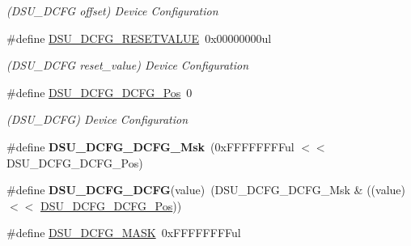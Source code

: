 \begin{DoxyCompactItemize}
\begin{DoxyCompactList}\small\item\em (D\+S\+U\+\_\+\+D\+C\+F\+G offset) Device Configuration \end{DoxyCompactList}\item 
\hypertarget{group___s_a_m_l21___d_s_u_ga0aa811e0e4f8e89e24c99f75474fe970}{}\#define \hyperlink{group___s_a_m_l21___d_s_u_ga0aa811e0e4f8e89e24c99f75474fe970}{D\+S\+U\+\_\+\+D\+C\+F\+G\+\_\+\+R\+E\+S\+E\+T\+V\+A\+L\+U\+E}~0x00000000ul\label{group___s_a_m_l21___d_s_u_ga0aa811e0e4f8e89e24c99f75474fe970}

\begin{DoxyCompactList}\small\item\em (D\+S\+U\+\_\+\+D\+C\+F\+G reset\+\_\+value) Device Configuration \end{DoxyCompactList}\item 
\hypertarget{group___s_a_m_l21___d_s_u_ga348297fbddb02f9feae2e71d890f447a}{}\#define \hyperlink{group___s_a_m_l21___d_s_u_ga348297fbddb02f9feae2e71d890f447a}{D\+S\+U\+\_\+\+D\+C\+F\+G\+\_\+\+D\+C\+F\+G\+\_\+\+Pos}~0\label{group___s_a_m_l21___d_s_u_ga348297fbddb02f9feae2e71d890f447a}

\begin{DoxyCompactList}\small\item\em (D\+S\+U\+\_\+\+D\+C\+F\+G) Device Configuration \end{DoxyCompactList}\item 
\hypertarget{group___s_a_m_l21___d_s_u_ga3e4e3f317b6651412351a130375cfab5}{}\#define {\bfseries D\+S\+U\+\_\+\+D\+C\+F\+G\+\_\+\+D\+C\+F\+G\+\_\+\+Msk}~(0x\+F\+F\+F\+F\+F\+F\+F\+Ful $<$$<$ D\+S\+U\+\_\+\+D\+C\+F\+G\+\_\+\+D\+C\+F\+G\+\_\+\+Pos)\label{group___s_a_m_l21___d_s_u_ga3e4e3f317b6651412351a130375cfab5}

\item 
\hypertarget{group___s_a_m_l21___d_s_u_gaddf763024200abb98a7b07f6a46b841f}{}\#define {\bfseries D\+S\+U\+\_\+\+D\+C\+F\+G\+\_\+\+D\+C\+F\+G}(value)~(D\+S\+U\+\_\+\+D\+C\+F\+G\+\_\+\+D\+C\+F\+G\+\_\+\+Msk \& ((value) $<$$<$ \hyperlink{group___s_a_m_l21___d_s_u_ga348297fbddb02f9feae2e71d890f447a}{D\+S\+U\+\_\+\+D\+C\+F\+G\+\_\+\+D\+C\+F\+G\+\_\+\+Pos}))\label{group___s_a_m_l21___d_s_u_gaddf763024200abb98a7b07f6a46b841f}

\item 
\hypertarget{group___s_a_m_l21___d_s_u_ga65a54aa6066842546bda78f1b9d8abaa}{}\#define \hyperlink{group___s_a_m_l21___d_s_u_ga65a54aa6066842546bda78f1b9d8abaa}{D\+S\+U\+\_\+\+D\+C\+F\+G\+\_\+\+M\+A\+S\+K}~0x\+F\+F\+F\+F\+F\+F\+F\+Ful\label{group___s_a_m_l21___d_s_u_ga65a54aa6066842546bda78f1b9d8abaa}


\end{DoxyCompactItemize}
